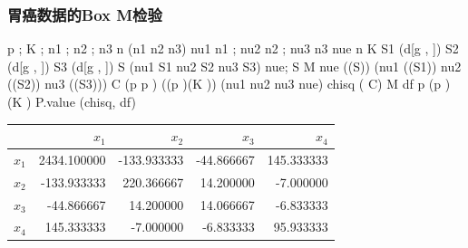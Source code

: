 \subsubsection{胃癌数据的Box M检验}
\begin{code}
p \ROperator{<-} ; K \ROperator{<-} ; n1 \ROperator{<-} ; n2 \ROperator{<-} ; n3 \ROperator{<-} 
n \ROperator{<-} (n1 \ROperator{+} n2 \ROperator{+} n3)
nu1 \ROperator{<-} n1 \ROperator{-} ; nu2 \ROperator{<-} n2 \ROperator{-} ; nu3 \ROperator{<-} n3 \ROperator{-} 
nue \ROperator{<-} n \ROperator{-} K
S1 \ROperator{<-} (d[g \ROperator{==} , \ROperator{:}])
S2 \ROperator{<-} (d[g \ROperator{==} , \ROperator{:}])
S3 \ROperator{<-} (d[g \ROperator{==} , \ROperator{:}])
S \ROperator{<-} (nu1 \ROperator{*} S1 \ROperator{+} nu2 \ROperator{*} S2 \ROperator{+} nu3 \ROperator{*} S3) \ROperator{/} nue; S
M \ROperator{<-} nue \ROperator{*} ((S)) \ROperator{-}
  (nu1 \ROperator{*} ((S1)) \ROperator{+} nu2 \ROperator{*} ((S2)) \ROperator{+} nu3 \ROperator{*} ((S3)))
C \ROperator{<-} (\ROperator{*}p\ROperator{\textasciicircum{}} \ROperator{+} \ROperator{*}p \ROperator{-} ) \ROperator{/} (\ROperator{*}(p \ROperator{+} )\ROperator{*}(K \ROperator{-} )) \ROperator{*}
  (\ROperator{/}nu1 \ROperator{+} \ROperator{/}nu2 \ROperator{+} \ROperator{/}nu3 \ROperator{-} \ROperator{/}nue)
chisq \ROperator{<-} ( \ROperator{-} C) \ROperator{*} M
df \ROperator{<-} p \ROperator{*} (p \ROperator{+} ) \ROperator{*} (K \ROperator{-} ) \ROperator{/} 
P.value \ROperator{<-}  \ROperator{-} (chisq, df)
\end{code}
\par\addvspace{5pt}\begin{center}\begin{minipage}{\linewidth}\centering
\small
{}
\begin{tabular}{lrrrr}\toprule
 &{\bfseries  $x_1$ }&{\bfseries  $x_2$ }&{\bfseries  $x_3$ }&{\bfseries  $x_4$}\\\midrule
$x_1$ & 2434.100000 & -133.933333 & -44.866667 & 145.333333\\
$x_2$ & -133.933333 & 220.366667 & 14.200000 & -7.000000\\
$x_3$ & -44.866667 & 14.200000 & 14.066667 & -6.833333\\
$x_4$ & 145.333333 & -7.000000 & -6.833333 & 95.933333\\
\bottomrule\end{tabular}
\end{minipage}\end{center}

